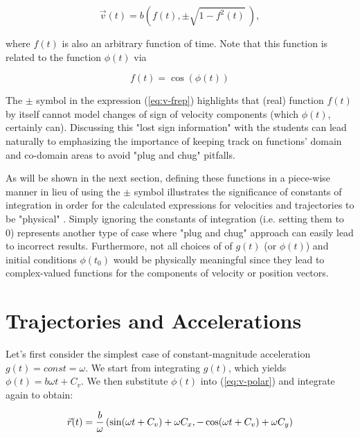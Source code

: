 \documentclass[journal]{IEEEtran}
\begin{document}
\begin{equation}
\vec{v}(t)=b(f(t), {\pm\sqrt{1-f^2(t)}} \ ),
\label{eq:v-frep}
\end{equation}

where $f(t)$ is also an arbitrary function of time.  Note that this function is related to the function $\phi (t)$ via 

\begin{equation}
f (t) = \cos (\phi (t))
\label{eq:f-from-phi}
\end{equation}

\par The $\pm$ symbol in the expression (\ref{eq:v-frep}) highlights that (real) function $f(t)$ by itself cannot model changes of sign of velocity components (which $\phi(t)$, certainly can). Discussing this "lost sign information" with the students can lead naturally to emphasizing the importance of keeping track on functions' domain and co-domain areas to avoid "plug and chug" pitfalls.

\par As will be shown in the next section, defining these functions in a piece-wise manner in lieu of using the $\pm$ symbol illustrates the significance of constants of integration in order for the calculated expressions for velocities and trajectories to be "physical" . Simply ignoring the constants of integration (i.e. setting them to 0) represents another type of case where "plug and chug" approach can easily lead to incorrect results.  Furthermore, not all choices of of $g(t)$ (or $\phi (t)$) and initial conditions $\phi (t_0)$ would be physically meaningful since they lead to complex-valued functions for the components of velocity or position vectors.

\section{\bf\large Trajectories and Accelerations}
\par Let's first consider the simplest case of constant-magnitude acceleration $g(t)= const = \omega$. We start from integrating $g(t)$, which yields $\phi(t)= b \omega t + C_v$. We then substitute $\phi (t)$ into (\ref{eq:v-polar}) and integrate again to obtain:

\begin{equation}
\vec{r}(t)= {b\over \omega} \left( \sin (\omega t + C_v) + \omega C_x, -\cos (\omega t + C_v) + \omega C_y \right)
\label{eq:uniform-traject}
\end{equation}
\end{document}
